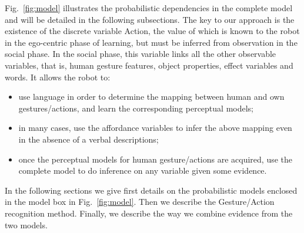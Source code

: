 Fig.~\ref{fig:model} illustrates the probabilistic dependencies in the complete model and will be detailed in the following subsections.
The key to our approach is the existence of the discrete variable Action, the value of which is known to the robot in the ego-centric phase of learning, but must be inferred from observation in the social phase.
In the social phase, this variable links all the other observable variables, that is, human gesture features, object properties, effect variables and words.
It allows the robot to:
\begin{itemize}
\item use language in order to determine the mapping between human and own gestures/actions, and learn the corresponding perceptual models;
\item in many cases, use the affordance variables to infer the above mapping even in the absence of a verbal descriptions;
\item once the perceptual models for human gesture/actions are acquired, use the complete model to do inference on any variable given some evidence.
\end{itemize}
In the following sections we give first details on the probabilistic models enclosed in the \AffWords{} model box in Fig.~\ref{fig:model}.
Then we describe the Gesture/Action recognition method.
Finally, we describe the way we combine evidence from the two models.


